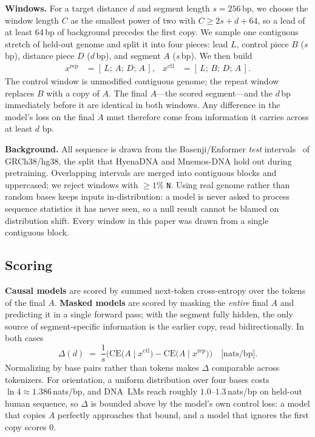 \textbf{Windows.} For a target distance $d$ and segment length $s=256$\,bp, we choose the
window length $C$ as the smallest power of two with $C \ge 2s+d+64$, so a lead of at least
64\,bp of background precedes the first copy. We sample one contiguous stretch of held-out
genome and split it into four pieces: lead $L$, control piece $B$ ($s$\,bp), distance piece
$D$ ($d$\,bp), and segment $A$ ($s$\,bp). We then build
\begin{align*}
  x^{\text{rep}} &= [\,L;\,A;\,D;\,A\,], &
  x^{\text{ctl}} &= [\,L;\,B;\,D;\,A\,].
\end{align*}
The control window is unmodified contiguous genome; the repeat window replaces $B$ with a
copy of $A$. The final $A$---the scored segment---and the $d$\,bp immediately before it are
identical in both windows. Any difference in the model's loss on the final $A$ must therefore
come from information it carries across at least $d$ bp.

\textbf{Background.} All sequence is drawn from the Basenji/Enformer \emph{test}
intervals~\cite{kelley2018basenji,avsec2021enformer} of GRCh38/hg38, the split that HyenaDNA
and Mnemos-DNA hold out during pretraining. Overlapping intervals are merged into contiguous
blocks and uppercased; we reject windows with $\ge 1\%$ \texttt{N}. Using real genome rather
than random bases keeps inputs in-distribution: a model is never asked to process sequence
statistics it has never seen, so a null result cannot be blamed on distribution shift. Every
window in this paper was drawn from a single contiguous block.

\subsection{Scoring}
\label{sec:scoring}

\textbf{Causal models} are scored by summed next-token cross-entropy over the tokens of the
final $A$. \textbf{Masked models} are scored by masking the \emph{entire} final $A$ and
predicting it in a single forward pass; with the segment fully hidden, the only source of
segment-specific information is the earlier copy, read bidirectionally. In both cases
\begin{equation}
  \Delta(d) \;=\; \frac{1}{s}\Big(\mathrm{CE}\big(A \mid x^{\text{ctl}}\big)
               - \mathrm{CE}\big(A \mid x^{\text{rep}}\big)\Big)
  \quad\text{[nats/bp]}.
\end{equation}
Normalizing by base pairs rather than tokens makes $\Delta$ comparable across tokenizers.
For orientation, a uniform distribution over four bases costs $\ln 4 \approx 1.386$\,nats/bp,
and DNA~LMs reach roughly $1.0$--$1.3$\,nats/bp on held-out human sequence, so $\Delta$ is
bounded above by the model's own control loss: a model that copies $A$ perfectly approaches
that bound, and a model that ignores the first copy scores $0$.

